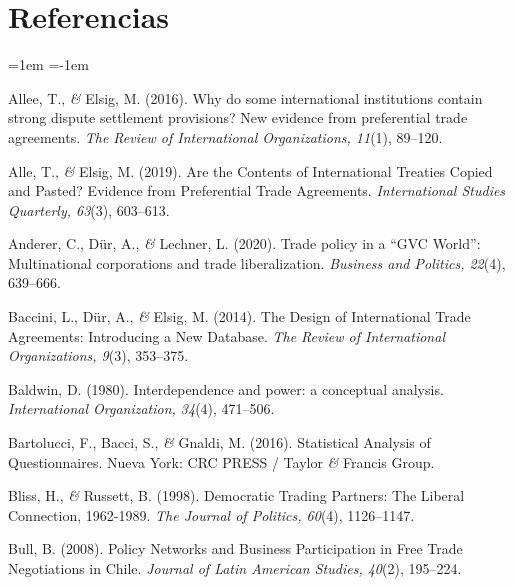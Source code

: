 \documentclass[a4paper]{tufte-handout}
\begin{document}

\section{{\normalfont Referencias}}


\begin{list}{}%
{\leftmargin=1em \itemindent=-1em}

\item{\small Allee, T., {\itshape \&} Elsig, M. (2016). Why do some international institutions contain strong dispute settlement provisions? New evidence from preferential trade agreements. {\itshape The Review of International Organizations, 11}(1), 89--120.}

\item{\small Alle, T., {\itshape \&} Elsig, M. (2019). Are the Contents of International Treaties Copied and Pasted? Evidence from Preferential Trade Agreements. {\itshape International Studies Quarterly, 63}(3), 603--613.}

\item{\small Anderer, C., Dür, A., {\itshape \&} Lechner, L. (2020). Trade policy in a “GVC World”: Multinational corporations and trade liberalization. {\itshape Business and Politics, 22}(4), 639--666.}

\item{\small Baccini, L., Dür, A., {\itshape \&} Elsig, M. (2014). The Design of International Trade Agreements: Introducing a New Database. {\itshape The Review of International Organizations, 9}(3), 353--375.}

\item{\small Baldwin, D. (1980). Interdependence and power: a conceptual analysis. {\itshape International Organization, 34}(4), 471--506.}

\item{\small Bartolucci, F., Bacci, S., {\itshape \&} Gnaldi, M. (2016). Statistical Analysis of Questionnaires. Nueva York: CRC PRESS / Taylor {\itshape \&} Francis Group.}

\item{\small Bliss, H., {\itshape \&} Russett, B. (1998). Democratic Trading Partners: The Liberal Connection, 1962-1989. {\itshape The Journal of Politics, 60}(4), 1126--1147.}

\item{\small Bull, B. (2008). Policy Networks and Business Participation in Free Trade Negotiations in Chile. {\itshape Journal of Latin American Studies, 40}(2), 195--224.}


\end{list}
\end{document}
